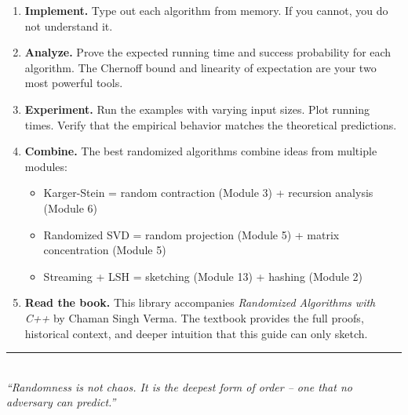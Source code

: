 \documentclass[11pt,a4paper]{article}
\begin{document}
\begin{enumerate}
    \item \textbf{Implement.} Type out each algorithm from memory. If you cannot, you do not understand it.

    \item \textbf{Analyze.} Prove the expected running time and success probability for each algorithm. The Chernoff bound and linearity of expectation are your two most powerful tools.

    \item \textbf{Experiment.} Run the examples with varying input sizes. Plot running times. Verify that the empirical behavior matches the theoretical predictions.

    \item \textbf{Combine.} The best randomized algorithms combine ideas from multiple modules:
    \begin{itemize}[nosep]
        \item Karger-Stein = random contraction (Module 3) + recursion analysis (Module 6)
        \item Randomized SVD = random projection (Module 5) + matrix concentration (Module 5)
        \item Streaming + LSH = sketching (Module 13) + hashing (Module 2)
    \end{itemize}

    \item \textbf{Read the book.} This library accompanies \textit{Randomized Algorithms with C++} by Chaman Singh Verma. The textbook provides the full proofs, historical context, and deeper intuition that this guide can only sketch.
\end{enumerate}

\vspace{2em}
\begin{center}
\rule{0.4\textwidth}{0.5pt}\\[6pt]
{\small\textit{``Randomness is not chaos. It is the deepest form of order -- one that no adversary can predict.''}}
\end{center}
\end{document}
